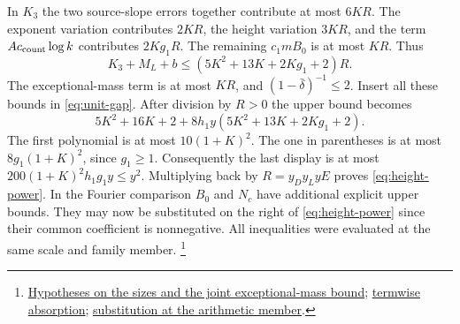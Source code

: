 In \(K_3\) the two source-slope errors together contribute at most
\(6KR\). The exponent variation contributes \(2KR\), the height
variation \(3KR\), and the term \(Ac_{\rm count}\log k\) contributes
\(2K g_1R\). The remaining \(c_1mB_0\) is at most \(KR\). Thus
\[
 K_3+M_L+b\le (5K^2+13K+2K g_1+2)R .
\]
The exceptional-mass term is at most \(KR\), and
\((1-\bar\delta)^{-1}\le2\). Insert all these bounds in
\eqref{eq:unit-gap}. After division by \(R>0\) the upper bound becomes
\[
  5K^2+16K+2+8h_1y(5K^2+13K+2K g_1+2).
\]
The first polynomial is at most \(10(1+K)^2\). The one in parentheses
is at most \(8g_1(1+K)^2\), since \(g_1\ge1\). Consequently the last
display is at most \(200(1+K)^2h_1g_1y\le y^2\).
Multiplying back by \(R=y_Dy_LyE\) proves \eqref{eq:height-power}.
In the Fourier comparison \(B_0\) and \(N_c\) have additional explicit
upper bounds. They may now be substituted on the right of
\eqref{eq:height-power} since their common coefficient is nonnegative.
All inequalities were evaluated at the same scale and family member.
\footnote{\href{https://github.com/Deicyde/riemann-hypothesis/blob/40e56bab/src/Formalism/SizeWindowBrackets/ErrorFormsWeakWindowsFalse.lean}{Hypotheses on the sizes and the joint exceptional-mass bound};
\href{https://github.com/Deicyde/riemann-hypothesis/blob/40e56bab/src/Formalism/SizeWindowBrackets/ChainSlopeWindows/SubThreeMulLogTwoLe.lean}{termwise absorption};
\href{https://github.com/Deicyde/riemann-hypothesis/blob/40e56bab/src/Development/AutomorphicArithmetic/DedekindLFunctions/LandauTheorems/ChTop.lean}{substitution at the arithmetic member}.}
